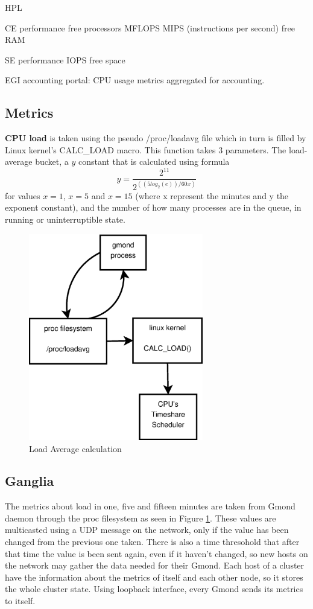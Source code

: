 HPL
\cite{gridbench}

CE performance
free processors
MFLOPS
MIPS (instructions per second)
free RAM

SE performance
IOPS
free space

EGI accounting portal: CPU usage metrics aggregated for accounting.
\newpage

\subsection{Metrics}\label{subsec:metrics}

{\bf CPU load} is taken using the pseudo /proc/loadavg file which in turn is
filled by Linux kernel's CALC\_LOAD macro. This function takes 3 parameters.
The load-average bucket, a $y$ constant that is calculated using formula
\[
y=\frac{2^{11}}{2^{((5log_2(e))/60x)}}
\]
for values $x=1$, $x=5$ and $x=15$ (where x represent the minutes and y the
exponent constant), and the number of how many processes are in the queue, in
running or uninterruptible state.

\begin{figure}[htb]
\centering
 \includegraphics[width=3in]{images/calc_load.eps}
\caption{Load Average calculation}
\label{figure:calc_load}
\end{figure}

\newpage

\subsection{Ganglia}

The metrics about load in one, five and fifteen minutes are taken from Gmond daemon through the proc filesystem as seen in Figure \ref{figure:calc_load}. These values are multicasted using a UDP message on the network, only if the value has been changed from the previous one taken. There is also a time thresohold that after that time the value is been sent again, even if it haven't changed, so new hosts on the network may gather the data needed for their Gmond. Each host of a cluster have the information about the metrics of itself and each other node, so it stores the whole cluster state. Using loopback interface, every Gmond sends its metrics to itself.

